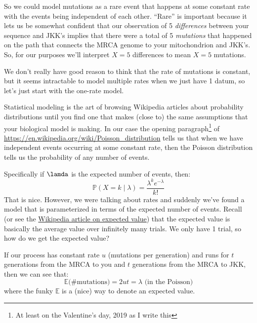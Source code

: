 \documentclass[11pt]{article}
\renewcommand{\Pr}{\mathbb{P}}
\newcommand{\href}[2]{\url{#2}}
\begin{document}
So we could model mutations as a rare event that happens at some constant rate with the
    events being independent of each other.
``Rare'' is important because it lets us be somewhat confident that our
    observation of 5 {\em differences} between your sequence and JKK's
    implies that there were a total of 5 {\em mutations} that happened on 
    the path that connects the MRCA genome to your mitochondrion and JKK's.
So, for our purposes we'll interpret $X=5$ differences to mean $X=5$ mutations.

We don't really have good reason to think that the rate of mutations is constant, but
    it seems intractable to model multiple rates when we just have 1 datum, so let's
    just start with the one-rate model.

Statistical modeling is the art of browsing Wikipedia articles about probability 
    distributions until you find one that makes (close to) the same assumptions
    that your biological model is making.
In our case the opening paragraph\footnote{At least on the Valentine's day, 2019
as I write this}
of \url{https://en.wikipedia.org/wiki/Poisson_distribution}
tells us that when we have independent events occurring at some constant rate, then
the Poisson distribution tells us the probability of any number of events.

Specifically if $\lamda$ is the expected number of events, then:
\begin{equation}
    \Pr(X=k\mid \lambda) = \frac{\lambda^k e^{-\lambda}}{k!}
\end{equation}
That is nice.
However, we were talking about rates and suddenly we've found a model
that is parameterized in terms of the expected number of events.
Recall (or see the \href{https://en.wikipedia.org/wiki/Expected_value}{Wikipedia article on expected value}) that the expected value is basically the average value over
infinitely many trials.
We only have 1 trial, so how do we get the expected value?

If our process has constant rate $u$ (mutations per generation) and runs for
$t$ generations from the MRCA to you and $t$ generations from the MRCA to JKK, then we can see that:
\begin{equation}
 \mathbb{E}(\mbox{\# mutations)} = 2 u t = \lambda \mbox{ (in the Poisson)}
\end{equation}
where the funky $\mathbb{E}$ is a (nice) way to denote an expected value.
\end{document}
